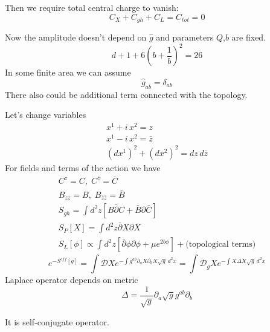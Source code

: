 \documentclass[a4paper,12pt]{article}
\theoremstyle{definition} \newtheorem{Def}{Definition}
\begin{document}
Then we require total central charge to vanish:
\begin{equation}
  \label{eq:30}
  C_X+C_{gh}+C_L=C_{tot}=0
\end{equation}

Now the amplitude doesn't depend on $\hat{g}$ and parameters $Q$,$b$ are fixed.
\begin{equation}
  \label{eq:18}
  d+1+6\left(b+\frac{1}{b}\right)^2=26
\end{equation}
In some finite area we can assume
\begin{equation}
  \label{eq:31}
  \hat{g}_{ab}=\delta_{ab}
\end{equation}
There also could be additional term connected with the topology.

Let's change variables
\begin{equation}
  \label{eq:32}
  \begin{split}
    x^1+i\, x^2=z\\
    x^1-i\, x^2=\bar{z}\\
    (dx^1)^2+(dx^2)^2=dz\,d\bar{z}
  \end{split}
\end{equation}
For fields and terms of the action we have
\begin{equation}
  \label{eq:33}
  \begin{split}
    C^z=C,\; C^{\bar{z}}=\bar{C}\\
    B_{zz}=B, \; B_{\bar{z}\bar{z}}=\bar{B}\\
    S_{gh}=\int d^2z [B\bar{\partial}C+\bar{B}\partial \bar{C}]\\
    S_P[X]=\int d^2z \bar{\partial}X \partial X\\
    S_L[\phi] \propto \int d^2z \left[\bar{\partial} \phi \partial \phi+\mu e^{2 b \phi}\right] + \mbox{(topological terms)}
  \end{split}
\end{equation}
\begin{equation}
  \label{eq:34}
  e^{-S^{eff}[g]}=\int \mathcal{D} X e^{-\int g^{ab}\partial_a X \partial_b X \sqrt{g}\, d^2x} = \int \mathcal{D}_g X e^{-\int X \Delta X\sqrt{g}\, d^2x}
\end{equation}
Laplace operator depends on metric
\begin{equation}
  \label{eq:35}
  \Delta = \frac{1}{\sqrt{g}}\partial_a \sqrt{g} g^{ab}\partial_b
\end{equation}

It is self-conjugate operator.
\end{document}
